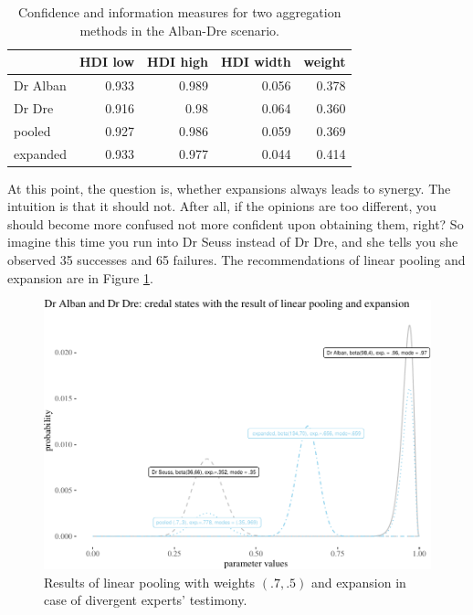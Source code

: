 \documentclass[
  10pt,
  dvipsnames,enabledeprecatedfontcommands]{scrartcl}
\begin{document}
\begin{table}
\begin{tabular}{lrrrr}
\toprule
  & HDI low & HDI high & HDI width & weight\\
\midrule
Dr Alban & 0.933 & 0.989 & 0.056 & 0.378\\
Dr Dre & 0.916 & 0.98 & 0.064 & 0.360\\
pooled & 0.927 & 0.986 & 0.059 & 0.369\\
expanded & 0.933 & 0.977 & 0.044 & 0.414\\
\bottomrule
\end{tabular}
\caption{Confidence and information measures for two aggregation methods in the Alban-Dre scenario.}
\label{tab:synergy}
\end{table}

At this point, the question is, whether expansions always leads to
synergy. The intuition is that it should not. After all, if the opinions
are too different, you should become more confused not more confident
upon obtaining them, right? So imagine this time you run into Dr Seuss
instead of Dr Dre, and she tells you she observed 35 successes and 65
failures. The recommendations of linear pooling and expansion are in
Figure \ref{fig:seuss}.

\begin{figure}[H]

\begin{center}\includegraphics[width=1\linewidth]{impreciseEpistemicFINAL_files/figure-latex/fig:seuss-1} \end{center}

\caption{Results of linear pooling with weights $(.7, .5)$ and expansion in case of divergent experts' testimony.}
\label{fig:seuss}
\end{figure}
\end{document}
